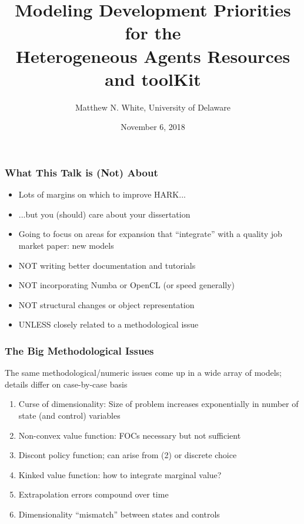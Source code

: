 \documentclass[11pt]{beamer}
\author{Matthew N. White, University of Delaware}
\title{Modeling Development Priorities for the \\ Heterogeneous Agents Resources and toolKit}
\date{November 6, 2018}
\newcommand{\bi}{\begin{itemize}}
\newcommand{\ei}{\end{itemize}}
\begin{document}
\begin{frame}
\maketitle
\end{frame}


\begin{frame}
\frametitle{What This Talk is (Not) About}

\bi
\item <1->Lots of margins on which to improve HARK...

\item <1->...but you (should) care about your dissertation

\item <2->Going to focus on areas for expansion that ``integrate'' with a quality job market paper: new models

\item <3->NOT writing better documentation and tutorials

\item <4->NOT incorporating Numba or OpenCL (or speed generally)

\item <5->NOT structural changes or object representation

\item <5->UNLESS closely related to a methodological issue

\ei
\end{frame}



\begin{frame}
\frametitle{The Big Methodological Issues}

The same methodological/numeric issues come up in a wide array of models; details differ on case-by-case basis
\begin{enumerate}
\item <1->Curse of dimensionality: Size of problem increases exponentially in number of state (and control) variables

\item <2->Non-convex value function: FOCs necessary but not sufficient

\item <3->Discont policy function; can arise from (2) or discrete choice

\item <4->Kinked value function: how to integrate marginal value?

\item <5->Extrapolation errors compound over time

\item <6->Dimensionality ``mismatch'' between states and controls
\end{enumerate}

\end{frame}
\end{document}
